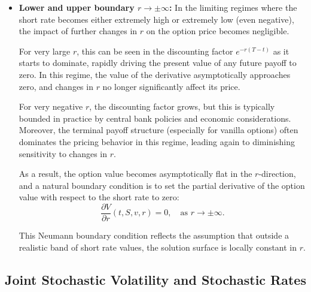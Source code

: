 \documentclass[12pt]{report} %
\theoremstyle{plain} %
\theoremstyle{definition} %
\theoremstyle{remark} %
\begin{document}
\begin{itemize}
    \item \textbf{Lower and upper boundary \( r \to \pm\infty \):} 
    In the limiting regimes where the short rate becomes either 
	extremely high or extremely low (even negative), the impact 
	of further changes in \( r \) on the option price becomes 
	negligible. 
	
	For very large \( r \), this can be seen in the discounting 
	factor \( e^{-r(T - t)} \) as it starts to dominate, rapidly driving the 
	present value of any future payoff to zero. In this regime, 
	the value of the derivative asymptotically approaches zero, 
	and changes in \( r \) no longer significantly affect its price.
	
	For very negative \( r \), the discounting factor grows, 
	but this is typically bounded in practice by central bank 
	policies and economic considerations. Moreover, the terminal 
	payoff structure (especially for vanilla options) often dominates 
	the pricing behavior in this regime, leading again to diminishing 
	sensitivity to changes in \( r \).
    
    As a result, the option value becomes asymptotically 
	flat in the \( r \)-direction, and a natural boundary condition 
	is to set the partial derivative of the option value with respect 
	to the short rate to zero:
    \[
        \frac{\partial V}{\partial r}(t, S, v, r) = 0,
        \quad \text{as } r \to \pm\infty.
    \]

    This Neumann boundary condition reflects the assumption that 
	outside a realistic band of short rate values, the solution 
	surface is locally constant in \( r \).
\end{itemize}


\subsection{Joint Stochastic Volatility and Stochastic Rates}\label{sec:sv_rates}
\end{document}
